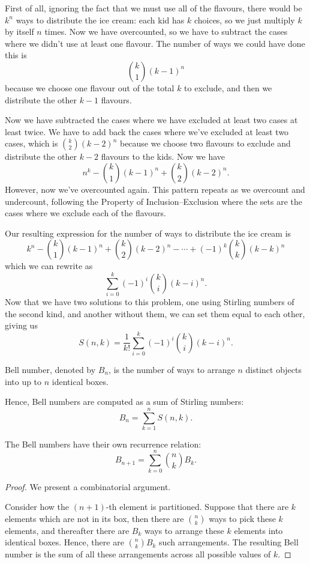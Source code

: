 First of all, ignoring the fact that we must use all of the flavours, there would be $k^n$ ways to distribute the ice cream: each kid has $k$ choices, so we just multiply $k$ by itself $n$ times. Now we have overcounted, so we have to subtract the cases where we didn't use at least one flavour. The number of ways we could have
done this is
\[\binom{k}{1}(k-1)^n\]
because we choose one flavour out of the total $k$ to exclude, and then we distribute the other $k-1$ flavours.

Now we have subtracted the cases where we have excluded at least two cases at least twice. We have to add back the cases where we've excluded at least two cases, which is $\binom{k}{2}(k-2)^n$ because we choose two flavours to exclude and distribute the other $k-2$ flavours to the kids. Now we have
\[n^k-\binom{k}{1}(k-1)^n+\binom{k}{2}(k-2)^n.\]
However, now we've overcounted again. This pattern repeats as we overcount and undercount, following the Property of Inclusion--Exclusion where the sets are the cases where we exclude each of the flavours.

Our resulting expression for the number of ways to distribute the ice cream is
\[k^n-\binom{k}{1}(k-1)^n+\binom{k}{2}(k-2)^n-\cdots+(-1)^k\binom{k}{k}(k-k)^n\]
which we can rewrite as
\[\sum_{i=0}^k(-1)^i\binom{k}{i}(k-i)^n.\]
Now that we have two solutions to this problem, one using Stirling numbers of the second kind, and another without them, we can set them equal to each other, giving us
\begin{equation}
S(n,k)=\frac{1}{k!}\sum_{i=0}^k(-1)^i\binom{k}{i}(k-i)^n.
\end{equation}

\begin{definition}
Bell number, denoted by $B_n$, is the number of ways to arrange $n$ distinct objects into up to $n$ identical boxes.
\end{definition}

Hence, Bell numbers are computed as a sum of Stirling numbers:
\[B_n=\sum_{k=1}^n S(n,k).\]

The Bell numbers have their own recurrence relation:
\begin{equation}
B_{n+1}=\sum_{k=0}^n\binom{n}{k}B_k.
\end{equation}

\begin{proof}
We present a combinatorial argument.

Consider how the $(n+1)$-th element is partitioned. Suppose that there are $k$ elements which are not in its box, then there are $\binom{n}{k}$ ways to pick these $k$ elements, and thereafter there are $B_k$ ways to arrange these $k$ elements into identical boxes. Hence, there are $\binom{n}{k}B_k$ such arrangements. The resulting Bell number is the sum of all these arrangements across all possible values of $k$.
\end{proof}

